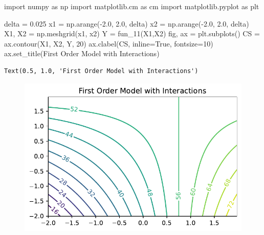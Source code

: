 \documentclass[
  letterpaper,
  DIV=11,
  numbers=noendperiod]{scrreprt}
\newenvironment{Shaded}{\begin{snugshade}}{\end{snugshade}}
\newcommand{\DecValTok}[1]{\textcolor[rgb]{0.68,0.00,0.00}{#1}}
\newcommand{\FloatTok}[1]{\textcolor[rgb]{0.68,0.00,0.00}{#1}}
\newcommand{\ImportTok}[1]{\textcolor[rgb]{0.00,0.46,0.62}{#1}}
\newcommand{\NormalTok}[1]{\textcolor[rgb]{0.00,0.23,0.31}{#1}}
\newcommand{\OperatorTok}[1]{\textcolor[rgb]{0.37,0.37,0.37}{#1}}
\newcommand{\StringTok}[1]{\textcolor[rgb]{0.13,0.47,0.30}{#1}}
\newcommand{\VariableTok}[1]{\textcolor[rgb]{0.07,0.07,0.07}{#1}}
\begin{document}
\begin{Shaded}
\begin{Highlighting}[]
\ImportTok{import}\NormalTok{ numpy }\ImportTok{as}\NormalTok{ np}
\ImportTok{import}\NormalTok{ matplotlib.cm }\ImportTok{as}\NormalTok{ cm}
\ImportTok{import}\NormalTok{ matplotlib.pyplot }\ImportTok{as}\NormalTok{ plt}

\NormalTok{delta }\OperatorTok{=} \FloatTok{0.025}
\NormalTok{x1 }\OperatorTok{=}\NormalTok{ np.arange(}\OperatorTok{{-}}\FloatTok{2.0}\NormalTok{, }\FloatTok{2.0}\NormalTok{, delta)}
\NormalTok{x2 }\OperatorTok{=}\NormalTok{ np.arange(}\OperatorTok{{-}}\FloatTok{2.0}\NormalTok{, }\FloatTok{2.0}\NormalTok{, delta)}
\NormalTok{X1, X2 }\OperatorTok{=}\NormalTok{ np.meshgrid(x1, x2)}
\NormalTok{Y }\OperatorTok{=}\NormalTok{ fun\_11(X1,X2)}
\NormalTok{fig, ax }\OperatorTok{=}\NormalTok{ plt.subplots()}
\NormalTok{CS }\OperatorTok{=}\NormalTok{ ax.contour(X1, X2, Y, }\DecValTok{20}\NormalTok{)}
\NormalTok{ax.clabel(CS, inline}\OperatorTok{=}\VariableTok{True}\NormalTok{, fontsize}\OperatorTok{=}\DecValTok{10}\NormalTok{)}
\NormalTok{ax.set\_title(}\StringTok{\textquotesingle{}First Order Model with Interactions\textquotesingle{}}\NormalTok{)}
\end{Highlighting}
\end{Shaded}

\begin{verbatim}
Text(0.5, 1.0, 'First Order Model with Interactions')
\end{verbatim}

\begin{figure}[H]

{\centering \includegraphics{005_num_rsm_files/figure-pdf/cell-7-output-2.pdf}

}

\end{figure}
\end{document}
